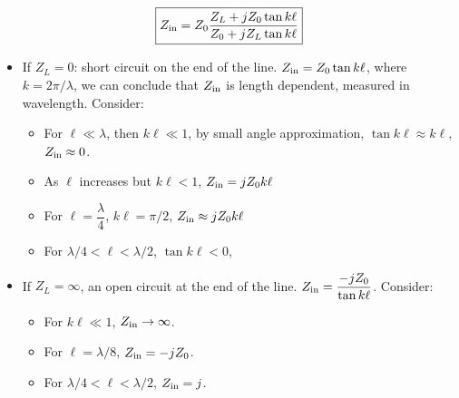 \documentclass[12pt,a4paper]{article}
\begin{document}
\[
\boxed{
    Z_{\rm in} = Z_0 \frac{Z_L + j Z_0 \tan k \ell}{Z_0 + j Z_L \tan k \ell}
}
\]



\begin{itemize}
    \item If $Z_L = 0$: short circuit on the end of the line. $Z_{\rm in} = Z_0 \tan k \ell$, where $k = 2 \pi / \lambda$, we can conclude that $Z_{\rm in}$ is length dependent, measured in wavelength. Consider:
    
    \begin{itemize}
        \item For $\ell \ll \lambda$, then $k \ell \ll 1$, by small angle approximation, $\tan k \ell \approx k \ell$, $Z_{\rm in} \approx 0$.

        \item As $\ell$ increases but $k \ell < 1$, $Z_{\rm in} = j Z_0 k \ell$

        \item For $\ell = \dfrac{\lambda}{4}$, $k \ell = \pi/2$, $Z_{\rm in} \approx j Z_0 k \ell$

        \item For $\lambda/4 < \ell < \lambda/2$, $\tan k\ell < 0$,
    \end{itemize}

    \item If $Z_L = \infty$, an open circuit at the end of the line. $Z_{\rm in} = \dfrac{-j Z_0}{\tan k \ell}$. Consider:
    \begin{itemize}
        \item For $k \ell \ll 1$, $Z_{\rm in} \to \infty$.

        \item For $\ell = \lambda /8$, $Z_{\rm in} = -j Z_0$.

        \item For $\lambda/4 < \ell < \lambda/2$, $Z_{\rm in} = j$.
    \end{itemize}
    
\end{itemize}
\end{document}
